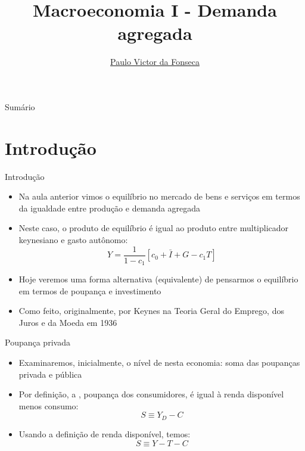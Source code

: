 \documentclass[10pt]{beamer}
\title[]{Macroeconomia I - Demanda agregada}
\author[]{\href{https://pvfonseca.github.io}{Paulo Victor da Fonseca}}
\date{}
\begin{document}
\begin{frame}[plain]
\end{frame}

\begin{frame}{Sumário}
    \tableofcontents
\end{frame}

\section{Introdução}
\begin{frame}
    {Introdução}
    \begin{itemize}
        \item Na aula anterior vimos o equilíbrio no mercado de bens e serviços em termos da igualdade entre produção e demanda agregada\bigskip
        \item Neste caso, o produto de equilíbrio é igual ao produto entre multiplicador keynesiano e gasto autônomo:
              \[
                  Y = \frac{1}{1-c_1}[c_0 + \bar{I} + G - c_1T]
              \]
        \item Hoje veremos uma forma alternativa (equivalente) de pensarmos o equilíbrio em termos de poupança e investimento\bigskip
        \item Como feito, originalmente, por Keynes na Teoria Geral do Emprego, dos Juros e da Moeda em 1936
    \end{itemize}
\end{frame}

\begin{frame}
    {Poupança privada}
    \begin{itemize}
        \item Examinaremos, inicialmente, o nível de  nesta economia: soma das poupanças privada e pública\bigskip
        \item Por definição, a , poupança dos consumidores, é igual à renda disponível menos consumo:
              \begin{equation}
                  S \equiv Y_D - C
              \end{equation}
        \item Usando a definição de renda disponível, temos:
              \[
                  S \equiv Y - T - C
              \]
    \end{itemize}
\end{frame}
\end{document}
